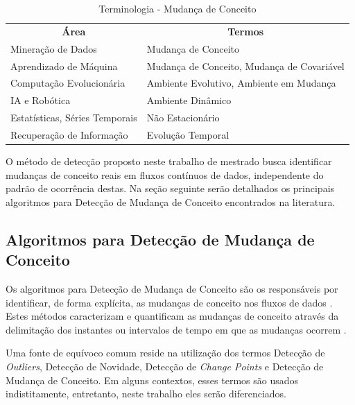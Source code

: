 \documentclass[qual, classic, a4paper]{ufbathesis}
\begin{document}
\begin{center} 
\begin{table}[H]
\label{tbl:taxonomy}
\begin{tabularx}{\textwidth}{|l|X|}
\cline{1-2}
\multicolumn{1}{|c|}{\textbf{Área}} & \multicolumn{1}{c|}{\textbf{Termos}}       \\ \cline{1-2}
Mineração de Dados                  & Mudança de Conceito                        \\ \cline{1-2}
Aprendizado de Máquina              & Mudança de Conceito, Mudança de Covariável \\ \cline{1-2}
Computação Evolucionária            & Ambiente Evolutivo, Ambiente em Mudança    \\ \cline{1-2}
IA e Robótica                       & Ambiente Dinâmico                          \\ \cline{1-2}
Estatísticas, Séries Temporais      & Não Estacionário                           \\ \cline{1-2}
Recuperação de Informação           & Evolução Temporal                          \\ \cline{1-2}
\end{tabularx}
\caption{Terminologia - Mudança de Conceito \cite{Zliobaite:2010}}
\end{table}
\end{center}

O método de detecção proposto neste trabalho de mestrado busca identificar mudanças de conceito reais em fluxos contínuos de dados, independente do padrão de ocorrência destas.
Na seção seguinte serão detalhados os principais algoritmos para Detecção de Mudança de Conceito encontrados na literatura.

\subsection{Algoritmos para Detecção de Mudança de Conceito}

Os algoritmos para Detecção de Mudança de Conceito são os responsáveis por identificar, de forma explícita, as mudanças de conceito nos fluxos de dados \cite{Gama:2014:SCD:2597757.2523813}.
Estes métodos caracterizam e quantificam as mudanças de conceito através da delimitação dos instantes ou intervalos de tempo em que as mudanças ocorrem \cite{Basseville:1993:DAC:151741}.

Uma fonte de equívoco comum reside na utilização dos termos Detecção de \textit{Outliers}, Detecção de Novidade, Detecção de \textit{Change Points} e Detecção de Mudança de Conceito.
Em alguns contextos, esses termos são usados indistitamente, entretanto, neste trabalho eles serão diferenciados.
\end{document}
